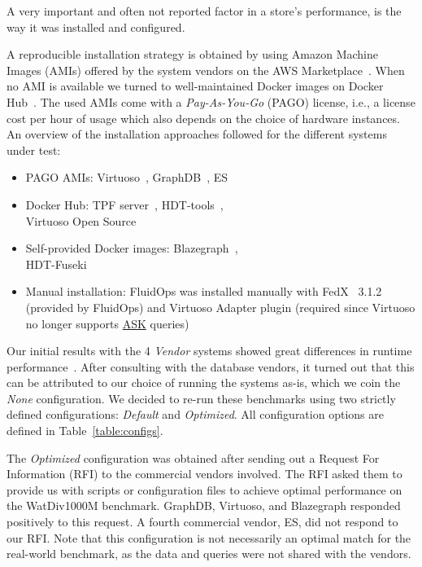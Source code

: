 A very important and often not reported factor in a store's performance, is the way it was installed and configured. 

A reproducible installation strategy is obtained by using Amazon Machine Images (AMIs) offered by the system vendors on the AWS Marketplace~\cite{awsmarketplace}. When no AMI is available we turned to well-maintained Docker images on Docker Hub~\cite{dockerhub}.
The used AMIs come with a \emph{Pay-As-You-Go} (PAGO) license, i.e., a license cost per hour of usage which also depends on the choice of hardware instances.
An overview of the installation approaches followed for the different systems under test:

\begin{itemize}
	\item PAGO AMIs: Virtuoso~\cite{Virtuoso}, GraphDB~\cite{graphdb}, ES
	\item Docker Hub: TPF server~\cite{dockerhubldfserver}, HDT-tools~\cite{hdtcpp}, \\ Virtuoso Open Source~\cite{virtuosoos} 
	\item Self-provided Docker images: Blazegraph~\cite{dockerblazegraph}, \\ HDT-Fuseki~\cite{hdtfuseki} 
	\item Manual installation: FluidOps was installed manually with FedX~\cite{saleem2016fine} 3.1.2 (provided by \mbox{FluidOps}) and Virtuoso Adapter plugin (required since \mbox{Virtuoso} no longer supports \url{ASK} queries)
\end{itemize}

Our initial results with the 4 \emph{Vendor} systems showed great differences in runtime performance~\cite{de2016big}. After consulting with the database vendors, it turned out that this can be attributed to our choice of running the systems as-is, which we coin the \emph{None} configuration. We decided to re-run these benchmarks using two strictly defined configurations: \emph{Default} and \emph{Optimized}. All configuration options are defined in Table~\ref{table:configs}. 

The \emph{Optimized} configuration was obtained after sending out a  Request For Information (RFI) to the commercial vendors involved. The RFI asked them to provide us with scripts or configuration files to achieve optimal performance on the WatDiv1000M benchmark. GraphDB, Virtuoso, and Blazegraph responded positively to this request. A fourth commercial vendor, ES, did not respond to our RFI. Note that this configuration is not necessarily an optimal match for the real-world benchmark, as the data and queries were not shared with the vendors.

